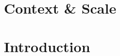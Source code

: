 \documentclass[5p,numafflabel]{elsarticle}
\begin{document}





\section*{Context \& Scale}





\section*{Introduction}
\label{sec:intro}



\label{sec:policyandtargets}


\end{document}
